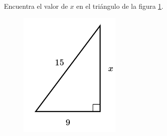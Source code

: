 Encuentra el valor de $x$ en el triángulo de la figura \ref{fig:lados_pitagoras_27}.

\begin{minipage}[t][][t]{0.3\textwidth}
    \begin{figure}[H]
        \centering
        \includegraphics[width=0.8\linewidth]{../images/lados_pitagoras_27.png}
        \caption{}
        \label{fig:lados_pitagoras_27}
    \end{figure}
\end{minipage}\hfill
